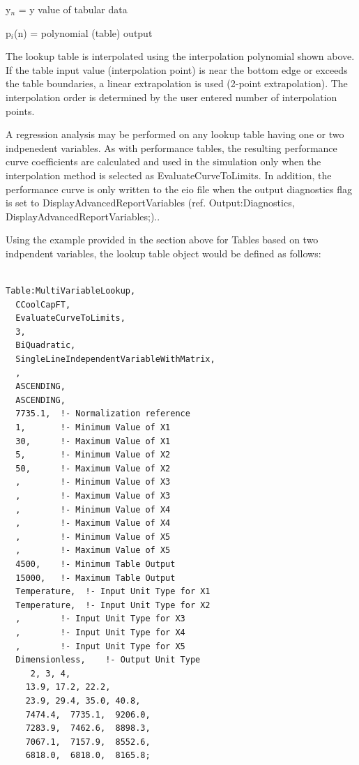 y\(_{n}\) = y value of tabular data

p\(_{i}\)(n) = polynomial (table) output

The lookup table is interpolated using the interpolation polynomial shown above. If the table input value (interpolation point) is near the bottom edge or exceeds the table boundaries, a linear extrapolation is used (2-point extrapolation). The interpolation order is determined by the user entered number of interpolation points.

A regression analysis may be performed on any lookup table having one or two indpenedent variables. As with performance tables, the resulting performance curve coefficients are calculated and used in the simulation only when the interpolation method is selected as EvaluateCurveToLimits. In addition, the performance curve is only written to the eio file when the output diagnostics flag is set to DisplayAdvancedReportVariables (ref. Output:Diagnostics, DisplayAdvancedReportVariables;)..

Using the example provided in the section above for Tables based on two indpendent variables, the lookup table object would be defined as follows:

\begin{lstlisting}

Table:MultiVariableLookup,
  CCoolCapFT,
  EvaluateCurveToLimits,
  3,
  BiQuadratic,
  SingleLineIndependentVariableWithMatrix,
  ,
  ASCENDING,
  ASCENDING,
  7735.1,  !- Normalization reference
  1,       !- Minimum Value of X1
  30,      !- Maximum Value of X1
  5,       !- Minimum Value of X2
  50,      !- Maximum Value of X2
  ,        !- Minimum Value of X3
  ,        !- Maximum Value of X3
  ,        !- Minimum Value of X4
  ,        !- Maximum Value of X4
  ,        !- Minimum Value of X5
  ,        !- Maximum Value of X5
  4500,    !- Minimum Table Output
  15000,   !- Maximum Table Output
  Temperature,  !- Input Unit Type for X1
  Temperature,  !- Input Unit Type for X2
  ,        !- Input Unit Type for X3
  ,        !- Input Unit Type for X4
  ,        !- Input Unit Type for X5
  Dimensionless,    !- Output Unit Type
     2, 3, 4,
    13.9, 17.2, 22.2,
    23.9, 29.4, 35.0, 40.8,
    7474.4,  7735.1,  9206.0,
    7283.9,  7462.6,  8898.3,
    7067.1,  7157.9,  8552.6,
    6818.0,  6818.0,  8165.8;
\end{lstlisting}
